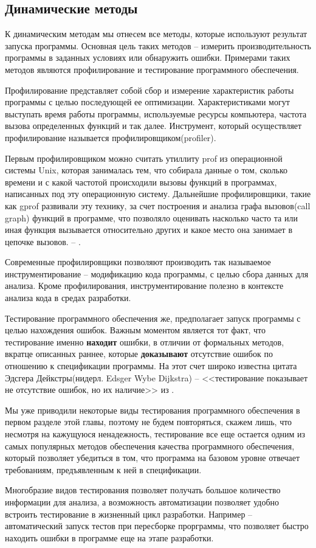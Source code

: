 \subsection{Динамические методы}

К динамическим методам мы отнесем все методы, которые используют результат запуска программы. Основная цель таких методов -- измерить производительность программы в заданных условиях или обнаружить ошибки. Примерами таких методов являются профилирование и тестирование программного обеспечения.

Профилирование представляет собой сбор и измерение характеристик работы программы с целью последующей ее оптимизации. Характеристиками могут выступать время работы программы, используемые ресурсы компьютера, частота вызова определенных функций и так далее. Инструмент, который осуществляет профилирование называется профилировщиком(profiler).

Первым профилировщиком можно считать утиллиту prof из операционной системы Unix, которая занималась тем, что собирала данные о том, сколько времени и с какой частотой происходили вызовы функций в программах, написанных под эту операционную систему. Дальнейшие профилировщики, такие как gprof развивали эту технику, за счет построения и анализа графа вызовов(call graph) функций в программе, что позволяло оценивать насколько часто та или иная функция вызывается относительно других и какое место она занимает в цепочке вызовов. -- \cite{Graham:1982:GCG:872726.806987}.

Современные профилировщики позволяют производить так называемое инструментирование -- модификацию кода программы, с целью сбора данных для анализа. Кроме профилирования, инструментирование полезно в контексте анализа кода в средах разработки.

Тестирование программного обеспечения же, предполагает запуск программы с целью нахождения ошибок. Важным моментом является тот факт, что тестирование именно \textbf{находит} ошибки, в отличии от формальных методов, вкратце описанных раннее, которые \textbf{доказывают} отсутствие ошибок по отношению к спецификации программы. На этот счет широко известна цитата Эдсгера Дейкстры(нидерл. Edsger Wybe Dijkstra) -- <<тестирование показывает не отсутствие ошибок, но их наличие>> из \cite{buxton1970software}.

Мы уже приводили некоторые виды тестирования программного обеспечения в первом разделе этой главы, поэтому не будем повторяться, скажем лишь, что несмотря на кажущуюся ненадежность, тестирование все еще остается одним из самых популярных методов обеспечения качества программного обеспечения, который позволяет убедиться в том, что программа на базовом уровне отвечает требованиям, предъявленным к ней в спецификации.

Многобразие видов тестирования позволяет получать большое количество информации для анализа, а возможность автоматизации позволяет удобно встроить тестирование в жизненный цикл разработки. Например -- автоматический запуск тестов при пересборке прорграммы, что позволяет быстро находить ошибки в программе еще на этапе разработки. 
